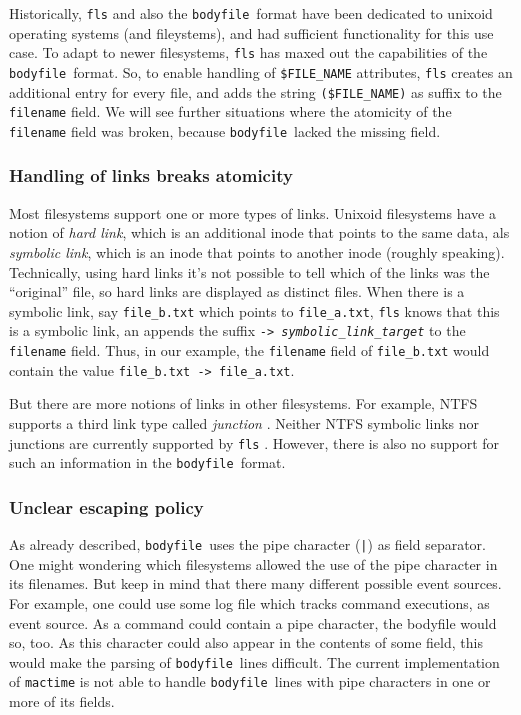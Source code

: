 \documentclass[twocolumn]{article}
\newcommand{\bodyfile}{\texttt{bodyfile}}
\begin{document}
Historically, \texttt{fls} and also the \bodyfile\ format have been dedicated to unixoid operating systems (and fileystems), and had sufficient functionality for this use case. To adapt to newer filesystems, \texttt{fls} has maxed out the capabilities of the \bodyfile\ format. So, to enable handling of \texttt{\$FILE\_NAME} attributes, \texttt{fls} creates an additional entry for every file, and adds the string \lstinline[style=inline]!($FILE_NAME)! as suffix to the \texttt{filename} field. We will see further situations where the atomicity of the \texttt{filename} field was broken, because \bodyfile\ lacked the missing field.

\subsubsection{Handling of links breaks atomicity}

Most filesystems support one or more types of links. Unixoid filesystems have a notion of \emph{hard link}, which is an additional inode that points to the same data, als \emph{symbolic link}, which is an inode that points to another inode (roughly speaking). Technically, using hard links it's not possible to tell which of the links was the \enquote{original} file, so hard links are displayed as distinct files. When there is a symbolic link, say \lstinline[style=inline]!file_b.txt! which points to \lstinline[style=inline]!file_a.txt!, \texttt{fls} knows that this is a symbolic link, an appends the suffix \texttt{\hbox{->} \emph{symbolic\_link\_target}} to the \texttt{filename} field. Thus, in our example, the \texttt{filename} field of \lstinline[style=inline]!file_b.txt! would contain the value \lstinline[style=inline]!file_b.txt -> file_a.txt!.

But there are more notions of links in other filesystems. For example, NTFS supports a third link type called \emph{junction} \citep{HardLinksAndJunctions}. Neither NTFS symbolic links nor junctions are currently supported by \texttt{fls} \citep{sleuthit-2645}. However, there is also no support for such an information in the \bodyfile\ format.

\subsubsection{Unclear escaping policy}

As already described, \bodyfile\ uses the pipe character (\texttt{|}) as field separator. One might wondering which filesystems allowed the use of the pipe character in its filenames. But keep in mind that there many different possible event sources. For example, one could use some log file which tracks command executions, as event source. As a command could contain a pipe character, the bodyfile would so, too. As this character could also appear in the contents of some field, this would make the parsing of \bodyfile\ lines difficult. The current implementation of \texttt{mactime} is not able to handle \bodyfile\ lines with pipe characters in one or more of its fields.



\end{document}
